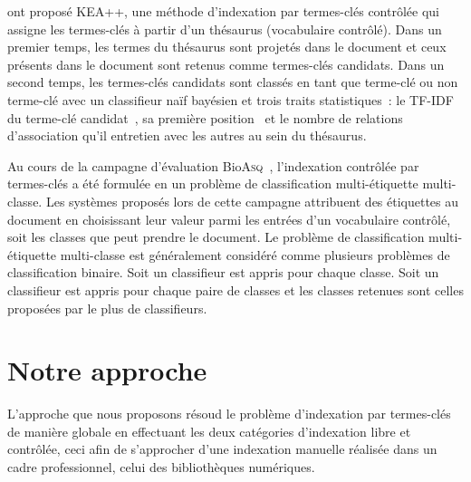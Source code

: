      ont proposé KEA++, une méthode d'indexation par
    termes-clés contrôlée qui assigne les termes-clés à partir d'un thésaurus
    (vocabulaire contrôlé).
    Dans un premier temps, les termes du thésaurus sont projetés dans le
    document et ceux présents dans le document sont retenus comme termes-clés
    candidats. Dans un second temps, les termes-clés candidats sont classés en
    tant que \og{}terme-clé\fg{} ou \og{}non terme-clé\fg{} avec un classifieur
    naïf bayésien et trois traits statistiques~: le TF-IDF du terme-clé
    candidat~\cite{witten1999kea}, sa première position~\cite{witten1999kea} et
    le nombre de relations d'association qu'il entretien avec les autres au sein
    du thésaurus.

    Au cours de la campagne d'évaluation
    Bio\textsc{Asq}~\cite{partalas2013bioasq}, l'indexation contrôlée par
    termes-clés a été formulée en un problème de classification multi-étiquette
    multi-classe. Les systèmes proposés lors de cette campagne attribuent des
    étiquettes au document en choisissant leur valeur parmi les entrées d'un
    vocabulaire contrôlé, soit les classes que peut prendre le document. Le
    problème de classification multi-étiquette multi-classe est généralement
    considéré comme plusieurs problèmes de classification binaire. Soit un
    classifieur est appris pour chaque classe. Soit un classifieur est appris
    pour chaque paire de classes et les classes retenues sont celles proposées
    par le plus de classifieurs.


\section{Notre approche}
\label{sec:main-domain_specific_keyphrase_annotation-topiccorank}
  L'approche que nous proposons résoud le problème d'indexation par termes-clés
  de manière globale en effectuant les deux catégories d'indexation libre et
  contrôlée, ceci afin de s'approcher d'une indexation manuelle réalisée dans un
  cadre professionnel, celui des bibliothèques numériques.

